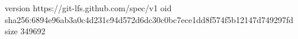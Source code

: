 version https://git-lfs.github.com/spec/v1
oid sha256:6894e96ab3a0c4d231c94d572d6dc30c0bc7ece1dd8f574f5b12147d749297fd
size 349692
